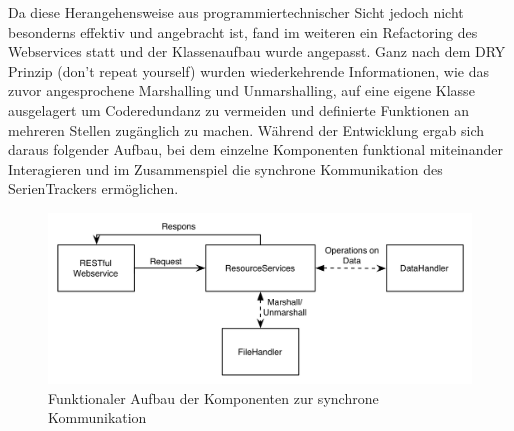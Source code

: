 \documentclass[a4paper]{article}
\begin{document}
Da diese Herangehensweise aus programmiertechnischer Sicht jedoch nicht besonderns effektiv und angebracht ist, fand im weiteren ein Refactoring des Webservices statt und der Klassenaufbau wurde angepasst. Ganz nach dem DRY Prinzip (don't repeat yourself) wurden wiederkehrende Informationen, wie das zuvor angesprochene Marshalling und Unmarshalling, auf eine eigene Klasse ausgelagert um Coderedundanz zu vermeiden und definierte Funktionen an mehreren Stellen zugänglich zu machen. Während der Entwicklung ergab sich daraus folgender Aufbau, bei dem einzelne Komponenten funktional miteinander Interagieren und im Zusammenspiel die synchrone Kommunikation des SerienTrackers ermöglichen. 
\begin{figure}[h!]
\includegraphics[width=1\textwidth]{images/aufbaurest.png}
\caption{Funktionaler Aufbau der Komponenten zur synchrone Kommunikation }
\label{RESTaufbau}
\end{figure}
\end{document}
